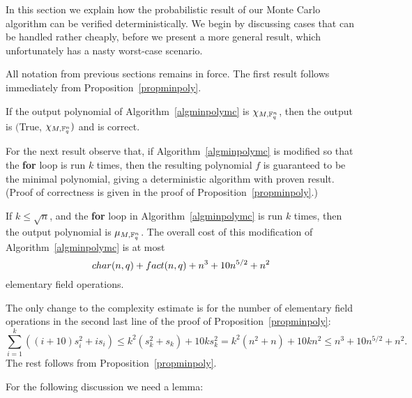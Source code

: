 In this section we explain how the probabilistic result of our Monte Carlo
algorithm can be verified deterministically. We begin by discussing cases
that can be handled rather cheaply, before we present a more general
result, which unfortunately has a nasty worst-case scenario.

All notation from previous sections remains in force. The first result 
follows immediately from Proposition~\ref{propminpoly}.

\begin{Prop}
If the output polynomial of Algorithm~\ref{algminpolymc} is  $\chi_{M,\mathbb{F}_q^n}$,
then the output is $(${\sc True}, $\chi_{M,\mathbb{F}_q^n})$
and is correct.
\end{Prop}

For the next result observe that, if Algorithm~\ref{algminpolymc} 
is modified so that the {\bf for} loop is run $k$ times, then the resulting 
polynomial $f$ is guaranteed to be the minimal polynomial, giving a deterministic
algorithm with proven result. (Proof of correctness 
is given in the proof of Proposition~\ref{propminpoly}.)

\begin{Prop}
If $k \le \sqrt{n}$,  and the {\bf for} loop in 
Algorithm~\ref{algminpolymc} is run $k$ times, then the output polynomial
is $\mu_{M,\mathbb{F}_q^n}$. The 
overall cost of this modification of Algorithm~\ref{algminpolymc} is at most
\[ {\rm char}(n,q) + {\rm fact}(n,q) + n^3 + 10 n^{5/2} + n^2 \]
elementary field operations.
\end{Prop}

\proofbeg The only change 
to the complexity estimate is for the number of elementary field operations 
in the second last line of the proof of Proposition~\ref{propminpoly}:
\[ \sum_{i=1}^k((i+10)s_i^2 + is_i)\le
k^2(s_k^2+s_k) +10 ks_k^2 
  = k^2 (n^2 + n) + 10 k n^2 \le n^3 + 10 n^{5/2} + n^2. \]
The rest follows from Proposition~\ref{propminpoly}.
\proofend

\medskip
For the following discussion we need a lemma:

